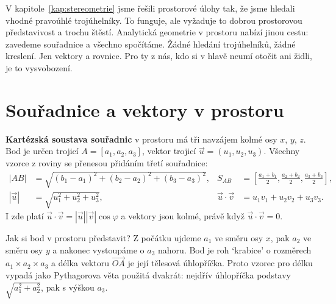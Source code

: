 \label{kap:prostor}

V kapitole~\ref{kap:stereometrie} jsme řešili prostorové úlohy tak, že jsme hledali vhodné pravoúhlé trojúhelníky. To funguje, ale vyžaduje to dobrou prostorovou představivost a trochu štěstí. Analytická geometrie v prostoru nabízí jinou cestu: zavedeme souřadnice a všechno spočítáme. Žádné hledání trojúhelníků, žádné kreslení. Jen vektory a rovnice. Pro ty z nás, kdo si v hlavě neumí otočit ani židli, je to vysvobození.

\section{Souřadnice a vektory v prostoru}\label{sec:souradnice-prostor}

\begin{definitionbox}
  \textbf{Kartézská soustava souřadnic} v prostoru má tři navzájem kolmé osy $x$, $y$, $z$. Bod je určen trojicí $A = [a_1, a_2, a_3]$, vektor trojicí $\vec{u} = (u_1, u_2, u_3)$. Všechny vzorce z roviny se přenesou přidáním třetí souřadnice:
  \begin{align*}
    |AB| &= \sqrt{{(b_1 - a_1)}^2 + {(b_2 - a_2)}^2 + {(b_3 - a_3)}^2}, & S_{AB} &= \left[\tfrac{a_1 + b_1}{2}, \tfrac{a_2 + b_2}{2}, \tfrac{a_3 + b_3}{2}\right],\\
    |\vec{u}| &= \sqrt{u_1^2 + u_2^2 + u_3^2}, & \vec{u}\cdot\vec{v} &= u_1v_1 + u_2v_2 + u_3v_3.
  \end{align*}
  I zde platí $\vec{u}\cdot\vec{v} = |\vec{u}||\vec{v}|\cos\varphi$ a vektory jsou kolmé, právě když $\vec{u}\cdot\vec{v} = 0$.
\end{definitionbox}

Jak si bod v prostoru představit? Z počátku ujdeme $a_1$ ve směru osy $x$, pak $a_2$ ve směru osy $y$ a nakonec vystoupáme o $a_3$ nahoru. Bod je roh `krabice' o rozměrech $a_1\times a_2\times a_3$ a délka vektoru $\overrightarrow{OA}$ je její tělesová úhlopříčka. Proto vzorec pro délku vypadá jako Pythagorova věta použitá dvakrát: nejdřív úhlopříčka podstavy $\sqrt{a_1^2 + a_2^2}$, pak s výškou $a_3$.

